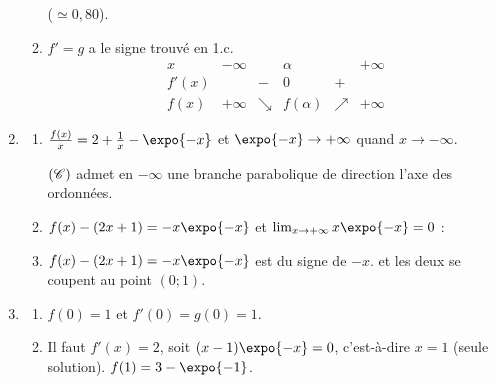 \begin{enumerate}
\begin{enumerate}
				 ($\simeq 0{,}80$).
			\item {} $f'=g$ a le signe trouvé en 1.c.
				\[
				\begin{array}{c|ccccc}
					x & -\infty & & \alpha & & +\infty \\ \hline
					f'(x) & & - & 0 & + & \\ \hline
					f(x) & +\infty & \searrow & f(\alpha) & \nearrow & +\infty
				\end{array}
				\]
		\end{enumerate}
		\item \begin{enumerate}
			\item {}
				$\frac{f(x)}{x} = 2 + \frac{1}{x} - \expo{-x}$ et $\expo{-x} \to +\infty$ quand $x \to -\infty$.

				 $\Courbe$ admet en $-\infty$ une branche parabolique
				de direction l'axe des ordonnées.
			\item {}
				$f(x) - (2x+1) = -x\expo{-x}$ et $\lim_{x\to+\infty} x\expo{-x} = 0$ :

			\item {} $f(x) - (2x+1) = -x\expo{-x}$ est du signe de $-x$.\newline
				\ansbox{$\Courbe$ est au-dessus de $\D$ sur $]-\infty;0[$, au-dessous sur $]0;+\infty[$,}
				et les deux se coupent au point $(0;1)$.
		\end{enumerate}
		\item \begin{enumerate}
			\item {} $f(0) = 1$ et $f'(0) = g(0) = 1$.

			\item {}
				Il faut $f'(x) = 2$, soit $(x-1)\expo{-x} = 0$, c'est-à-dire $x = 1$ (seule solution).
				$f(1) = 3 - \expo{-1}$.


\end{enumerate}
\end{enumerate}
